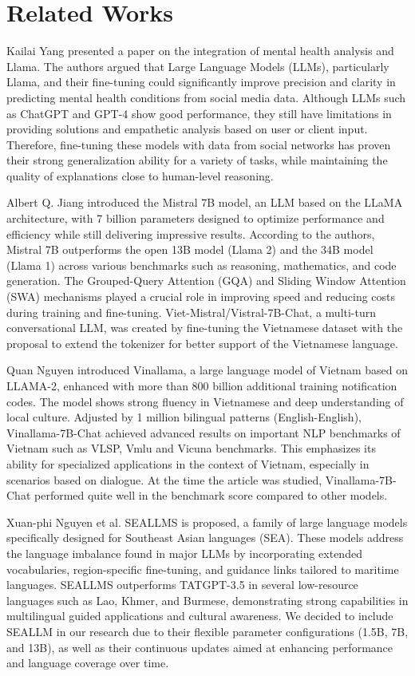 \documentclass[runningheads]{llncs}
\begin{document}
\section{Related Works}
\label{sec:Related Works}
Kailai Yang \cite{b1} presented a paper on the integration of mental health analysis and Llama. The authors argued that Large Language Models (LLMs), particularly Llama, and their fine-tuning could significantly improve precision and clarity in predicting mental health conditions from social media data. Although LLMs such as ChatGPT and GPT-4 show good performance, they still have limitations in providing solutions and empathetic analysis based on user or client input. Therefore, fine-tuning these models with data from social networks has proven their strong generalization ability for a variety of tasks, while maintaining the quality of explanations close to human-level reasoning.

Albert Q. Jiang\cite{b2} introduced the Mistral 7B model, an LLM based on the LLaMA architecture, with 7 billion parameters designed to optimize performance and efficiency while still delivering impressive results. According to the authors, Mistral 7B outperforms the open 13B model (Llama 2) and the 34B model (Llama 1) across various benchmarks such as reasoning, mathematics, and code generation. The Grouped-Query Attention (GQA) and Sliding Window Attention (SWA) mechanisms played a crucial role in improving speed and reducing costs during training and fine-tuning. Viet-Mistral/Vistral-7B-Chat, a multi-turn conversational LLM, was created by fine-tuning the Vietnamese dataset with the proposal to extend the tokenizer for better support of the Vietnamese language.

Quan Nguyen\cite{b3} introduced Vinallama, a large language model of Vietnam based on LLAMA-2, enhanced with more than 800 billion additional training notification codes. The model shows strong fluency in Vietnamese and deep understanding of local culture. Adjusted by 1 million bilingual patterns (English-English), Vinallama-7B-Chat achieved advanced results on important NLP benchmarks of Vietnam such as VLSP, Vmlu and Vicuna benchmarks. This emphasizes its ability for specialized applications in the context of Vietnam, especially in scenarios based on dialogue. At the time the article was studied, Vinallama-7B-Chat performed quite well in the benchmark score compared to other models.

Xuan-phi Nguyen et al. \cite{b4} SEALLMS is proposed, a family of large language models specifically designed for Southeast Asian languages (SEA). These models address the language imbalance found in major LLMs by incorporating extended vocabularies, region-specific fine-tuning, and guidance links tailored to maritime languages. SEALLMS outperforms TATGPT-3.5 in several low-resource languages such as Lao, Khmer, and Burmese, demonstrating strong capabilities in multilingual guided applications and cultural awareness. We decided to include SEALLM in our research due to their flexible parameter configurations (1.5B, 7B, and 13B), as well as their continuous updates aimed at enhancing performance and language coverage over time.
\end{document}
